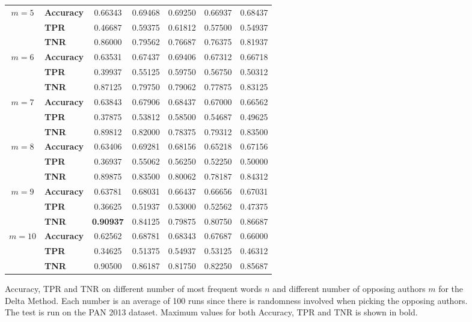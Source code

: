 \begin{figure}
\begin{tabular}{c|lccccc}
        \hline
        $m=5$  & \textbf{Accuracy} & 0.66343 & 0.69468 & 0.69250 & 0.66937 & 0.68437 \\
               & \textbf{TPR}      & 0.46687 & 0.59375 & 0.61812 & 0.57500 & 0.54937 \\
               & \textbf{TNR}      & 0.86000 & 0.79562 & 0.76687 & 0.76375 & 0.81937 \\
        \hline
        $m=6$  & \textbf{Accuracy} & 0.63531 & 0.67437 & 0.69406 & 0.67312 & 0.66718 \\
               & \textbf{TPR}      & 0.39937 & 0.55125 & 0.59750 & 0.56750 & 0.50312 \\
               & \textbf{TNR}      & 0.87125 & 0.79750 & 0.79062 & 0.77875 & 0.83125 \\
        \hline
        $m=7$  & \textbf{Accuracy} & 0.63843 & 0.67906 & 0.68437 & 0.67000 & 0.66562 \\
               & \textbf{TPR}      & 0.37875 & 0.53812 & 0.58500 & 0.54687 & 0.49625 \\
               & \textbf{TNR}      & 0.89812 & 0.82000 & 0.78375 & 0.79312 & 0.83500 \\
        \hline
        $m=8$  & \textbf{Accuracy} & 0.63406 & 0.69281 & 0.68156 & 0.65218 & 0.67156 \\
               & \textbf{TPR}      & 0.36937 & 0.55062 & 0.56250 & 0.52250 & 0.50000 \\
               & \textbf{TNR}      & 0.89875 & 0.83500 & 0.80062 & 0.78187 & 0.84312 \\
        \hline
        $m=9$  & \textbf{Accuracy} & 0.63781 & 0.68031 & 0.66437 & 0.66656 & 0.67031 \\
               & \textbf{TPR}      & 0.36625 & 0.51937 & 0.53000 & 0.52562 & 0.47375 \\
               & \textbf{TNR}      & \textbf{0.90937} & 0.84125 & 0.79875 & 0.80750 & 0.86687 \\
        \hline
        $m=10$ & \textbf{Accuracy} & 0.62562 & 0.68781 & 0.68343 & 0.67687 & 0.66000 \\
               & \textbf{TPR}      & 0.34625 & 0.51375 & 0.54937 & 0.53125 & 0.46312 \\
               & \textbf{TNR}      & 0.90500 & 0.86187 & 0.81750 & 0.82250 & 0.85687
    \end{tabular}
    \caption{Accuracy, \gls{TPR} and \gls{TNR} on different number of most
        frequent words $n$ and different number of opposing authors $m$ for the
        Delta Method. Each number is an average of 100 runs since there is
        randomness involved when picking the opposing authors. The test is run
        on the PAN 2013 dataset. Maximum values for both Accuracy, \gls{TPR} and
        \gls{TNR} is shown in bold.}
    \label{fig:delta_pan_2013_res}
\end{figure}

